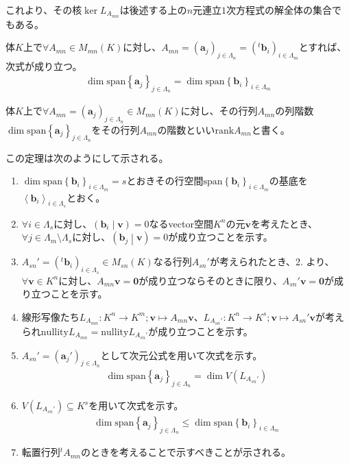 \documentclass[dvipdfmx]{jsarticle}
\begin{document}
これより、その核$\ker L_{A_{mn}}$は後述する上の$n$元連立$1$次方程式の解全体の集合でもある。
\begin{thm}\label{2.1.4.11}
体$K$上で$\forall A_{mn} \in M_{mn}(K)$に対し、$A_{mn} = \left( \mathbf{a}_{j} \right)_{j \in \varLambda_{n}} = \left(^{t}\mathbf{b}_{i} \right)_{i \in \varLambda_{m}}$とすれば、次式が成り立つ。
\begin{align*}
\dim{{\mathrm{span} }\left\{ \mathbf{a}_{j} \right\}_{j \in \varLambda_{n}}} = \dim{{\mathrm{span} }\left\{ \mathbf{b}_{i} \right\}_{i \in \varLambda_{m}}}
\end{align*}
\end{thm}
\begin{dfn}
体$K$上で$\forall A_{mn} = \left( \mathbf{a}_{j} \right)_{j \in \varLambda_{n}} \in M_{mn}(K)$に対し、その行列$A_{mn}$の列階数$\dim{{\mathrm{span} }\left\{ \mathbf{a}_{j} \right\}_{j \in \varLambda_{n}}}$をその行列$A_{mn}$の階数といい${\mathrm{rank} }A_{mn}$と書く。
\end{dfn}\par
この定理は次のようにして示される。
\begin{enumerate}
\item
  $\dim{{\mathrm{span} }\left\{ \mathbf{b}_{i} \right\}_{i \in \varLambda_{m}}} = s$とおきその行空間${\mathrm{span} }\left\{ \mathbf{b}_{i} \right\}_{i \in \varLambda_{m}}$の基底を$\left\langle \mathbf{b}_{i} \right\rangle_{i \in \varLambda_{s}}$とおく。
\item
  $\forall i \in \varLambda_{s}$に対し、$\left( \mathbf{b}_{i} \middle| \mathbf{v} \right) = 0$なるvector空間$K^{n}$の元$\mathbf{v}$を考えたとき、$\forall j \in \varLambda_{m} \setminus \varLambda_{s}$に対し、$\left( \mathbf{b}_{j} \middle| \mathbf{v} \right) = 0$が成り立つことを示す。
\item
  $A_{sn}' = \left(^{t}\mathbf{b}_{i} \right)_{i \in \varLambda_{s}} \in M_{sn}(K)$なる行列$A_{sn}'$が考えられたとき、2. より、$\forall\mathbf{v} \in K^{n}$に対し、$A_{mn}\mathbf{v} = \mathbf{0}$が成り立つならそのときに限り、$A_{sn}'\mathbf{v} = \mathbf{0}$が成り立つことを示す。
\item
  線形写像たち$L_{A_{mn}}:K^{n} \rightarrow K^{m};\mathbf{v} \mapsto A_{mn}\mathbf{v}$、$L_{A_{sn}'}:K^{n} \rightarrow K^{s};\mathbf{v} \mapsto A_{sn}'\mathbf{v}$が考えられ${\mathrm{nullity}}L_{A_{mn}} = {\mathrm{nullity}}L_{A_{sn}'}$が成り立つことを示す。
\item
  $A_{sn}' = \left( \mathbf{a}_{j}' \right)_{j \in \varLambda_{n}}$として次元公式を用いて次式を示す。
\begin{align*}
\dim{{\mathrm{span} }\left\{ \mathbf{a}_{j} \right\}_{j \in \varLambda_{n}}} = \dim{V\left( L_{A_{sn}'} \right)}
\end{align*}
\item
  $V\left( L_{A_{sn}'} \right) \subseteq K^{s}$を用いて次式を示す。
\begin{align*}
\dim{{\mathrm{span} }\left\{ \mathbf{a}_{j} \right\}_{j \in \varLambda_{n}}} \leq \dim{{\mathrm{span} }\left\{ \mathbf{b}_{i} \right\}_{i \in \varLambda_{m}}}
\end{align*}
\item
  転置行列${}^{t}A_{mn}$のときを考えることで示すべきことが示される。
\end{enumerate}
\end{document}
